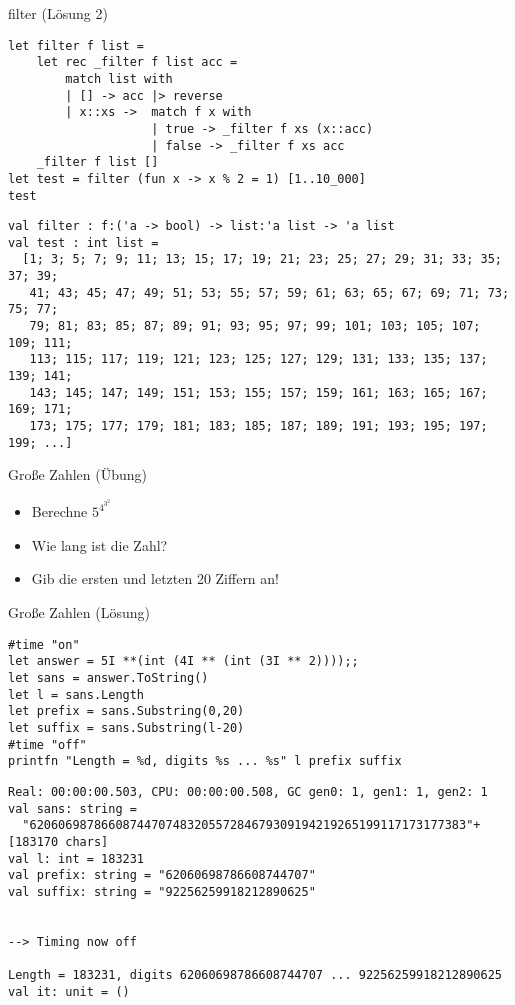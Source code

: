 \documentclass[t]{beamer}
\begin{document}
\begin{frame}[label={sec:org8256f3e},fragile]{filter (Lösung 2)}
 \begin{verbatim}
let filter f list = 
    let rec _filter f list acc = 
        match list with
        | [] -> acc |> reverse
        | x::xs ->  match f x with
                    | true -> _filter f xs (x::acc)
                    | false -> _filter f xs acc
    _filter f list []
let test = filter (fun x -> x % 2 = 1) [1..10_000]
test
\end{verbatim}

\begin{verbatim}
val filter : f:('a -> bool) -> list:'a list -> 'a list
val test : int list =
  [1; 3; 5; 7; 9; 11; 13; 15; 17; 19; 21; 23; 25; 27; 29; 31; 33; 35; 37; 39;
   41; 43; 45; 47; 49; 51; 53; 55; 57; 59; 61; 63; 65; 67; 69; 71; 73; 75; 77;
   79; 81; 83; 85; 87; 89; 91; 93; 95; 97; 99; 101; 103; 105; 107; 109; 111;
   113; 115; 117; 119; 121; 123; 125; 127; 129; 131; 133; 135; 137; 139; 141;
   143; 145; 147; 149; 151; 153; 155; 157; 159; 161; 163; 165; 167; 169; 171;
   173; 175; 177; 179; 181; 183; 185; 187; 189; 191; 193; 195; 197; 199; ...]
\end{verbatim}
\end{frame}

\begin{frame}[label={sec:org540ccea}]{Große Zahlen (Übung)}
\begin{itemize}
\item Berechne \(5^{4^{3^2}}\)
\item Wie lang ist die Zahl?
\item Gib die ersten und letzten 20 Ziffern an!
\end{itemize}
\end{frame}

\begin{frame}[label={sec:orgd0e1a87},fragile]{Große Zahlen (Lösung)}
 \begin{verbatim}
#time "on"
let answer = 5I **(int (4I ** (int (3I ** 2))));;
let sans = answer.ToString()
let l = sans.Length
let prefix = sans.Substring(0,20)
let suffix = sans.Substring(l-20)
#time "off"
printfn "Length = %d, digits %s ... %s" l prefix suffix
\end{verbatim}

\begin{verbatim}
Real: 00:00:00.503, CPU: 00:00:00.508, GC gen0: 1, gen1: 1, gen2: 1
val sans: string =
  "6206069878660874470748320557284679309194219265199117173177383"+[183170 chars]
val l: int = 183231
val prefix: string = "62060698786608744707"
val suffix: string = "92256259918212890625"


--> Timing now off

Length = 183231, digits 62060698786608744707 ... 92256259918212890625
val it: unit = ()
\end{verbatim}
\end{frame}
\end{document}
